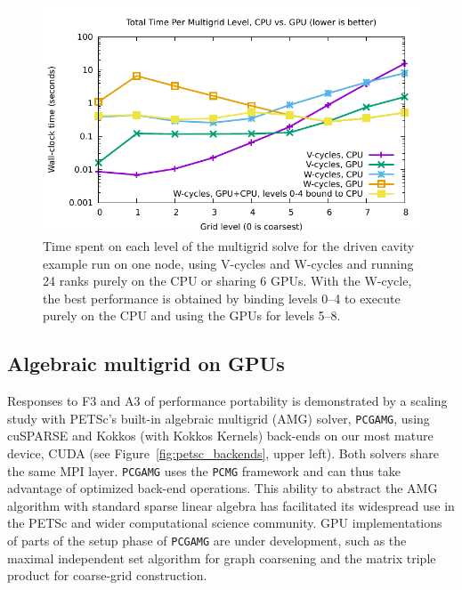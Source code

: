 \documentclass[10pt,journal,compsoc]{IEEEtran}
\begin{document}
\begin{figure}
    \centering
    \includegraphics[width=.95 \columnwidth]{figures/snes-ex19/combined-cpu_vs_gpu_by_level.pdf}
    \caption{Time spent on each level of the multigrid solve for the 
    driven cavity example run on one node, using V-cycles and W-cycles and
    running 24 ranks purely on the CPU or sharing 6 GPUs.
    With the W-cycle, the best performance is obtained by binding levels
    0--4 to execute purely on the CPU and using the GPUs for levels 5--8.
    }
    \label{fig:ex19-full-node}
\end{figure}


\subsection{Algebraic multigrid on GPUs}
\label{subsec:gamg}

Responses to F3 and A3  of performance portability is demonstrated by a scaling study with PETSc's built-in algebraic multigrid (AMG) solver, {\tt PCGAMG}, using cuSPARSE and Kokkos (with Kokkos Kernels) back-ends on our most mature device, CUDA (see Figure~\ref{fig:petsc_backends}, upper left). Both solvers share the same MPI layer.
{\tt PCGAMG} uses the {\tt PCMG} framework and can thus
take advantage of optimized back-end operations.
This ability to abstract the AMG algorithm with standard sparse linear algebra has facilitated its widespread use in the PETSc and wider computational science community.
GPU implementations of parts of the setup phase of {\tt PCGAMG} are under development,
such as the maximal independent set algorithm for graph coarsening and the matrix triple product for coarse-grid construction.
\end{document}
